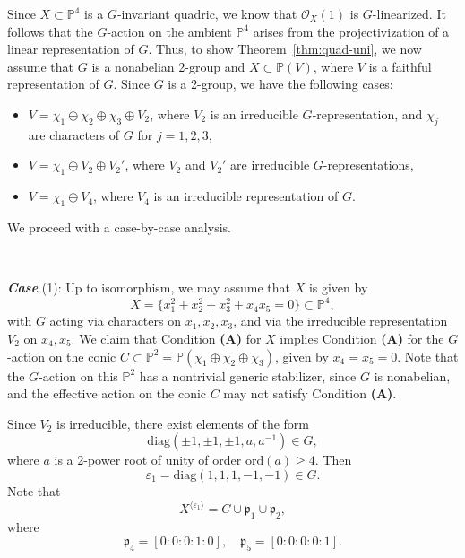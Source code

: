 \documentclass[12pt,reqno]{amsart}
\theoremstyle{plain}
\theoremstyle{remark}
\theoremstyle{definition}
\numberwithin{equation}{section}
\def\cO{{\mathcal O}}
\def\fD{{\mathfrak D}}
\def\bP{{\mathbb P}}
\begin{document}
Since $X\subset\bP^4$ is a $G$-invariant quadric, we know that $\cO_X(1)$ is $G$-linearized. It follows that the $G$-action on the ambient $\bP^4$ arises from the projectivization of a linear representation of $G$. Thus, to show Theorem~\ref{thm:quad-uni}, we now assume that $G$ is a nonabelian 2-group and $X\subset \bP(V)$, where $V$ is a faithful representation of $G$.  Since 
$G$ is a 2-group, we have the following cases: 
\begin{itemize}
    \item[(1)] $V=\chi_1\oplus\chi_2\oplus \chi_3\oplus V_2$, where $V_2$ is an irreducible $G$-representation, and $\chi_j$ are characters of $G$ for $j=1,2,3$, 
    \item[(2)]  $V=\chi_1\oplus V_2 \oplus V_2'$, where $V_2$ and $V_2'$ are irreducible $G$-representations, 
     \item[(3)]
     $V=\chi_1\oplus V_4$, where $V_4$ is an irreducible representation of $G$.
\end{itemize}
We proceed with a case-by-case analysis. 

\ 

{\bf\em Case} (1): Up to isomorphism, we may assume that $X$ is given by 
$$
X=\{x_1^2+x_2^2+x_3^2+x_4x_5=0\}\subset\bP^4,
$$ 
with 
$G$ acting via characters on $x_1,x_2, x_3$, and via the irreducible representation $V_2$ on $x_4,x_5$. 
We claim that Condition {\bf (A)} for $X$ implies Condition {\bf (A)} for the $G$-action on the conic $C\subset \bP^2=\bP(\chi_1\oplus \chi_2\oplus\chi_3)$, given by $x_4=x_5=0$. 
Note that the $G$-action on this $\bP^2$ has a nontrivial generic stabilizer, since $G$ is nonabelian, and the effective action on the conic $C$ may not satisfy Condition {\bf (A)}. 








Since $V_2$ is irreducible, there exist elements of the form 
$$
\mathrm{diag}(\pm1,\pm1,\pm1,a,a^{-1})\in G,
$$
where $a$ is a 2-power root of unity of order $\mathrm{ord}(a)\geq 4$. Then 
$$
\varepsilon_1=\mathrm{diag}(1,1,1,-1,-1)\in G.
$$
Note that 
$$
X^{\langle\varepsilon_1\rangle}=C\cup \mathfrak p_1\cup \mathfrak p_2,
$$
where 
$$
\mathfrak p_4=[0:0:0:1:0],\quad \mathfrak p_5=[0:0:0:0:1].
$$
\end{document}
